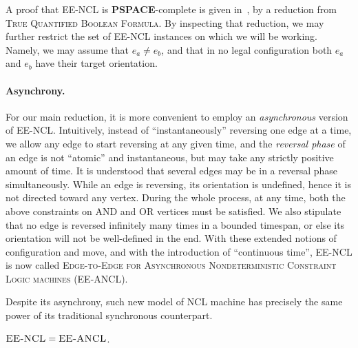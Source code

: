 \documentclass{style}
\newcommand{\complexityclass}[1]{\textbf{#1}}
\newcommand{\computproblem}[1]{\textsc{#1}}
\newcommand{\PSPACE}{\complexityclass{PSPACE}\xspace}
\newcommand{\EENCL}{\computproblem{EE-NCL}\xspace}
\newcommand{\EEANCL}{\computproblem{EE-ANCL}\xspace}
\begin{document}
A proof that \EENCL is \PSPACE-complete is given in~\cite{ncl}, by a reduction from \computproblem{True Quantified Boolean Formula}. By inspecting that reduction, we may further restrict the set of \EENCL instances on which we will be working. Namely, we may assume that $e_a\neq e_b$, and that in no legal configuration both $e_a$ and $e_b$ have their target orientation.

\paragraph{Asynchrony.}

For our main reduction, it is more convenient to employ an \emph{asynchronous} version of \EENCL. Intuitively, instead of ``instantaneously'' reversing one edge at a time, we allow any edge to start reversing at any given time, and the \emph{reversal phase} of an edge is not ``atomic'' and instantaneous, but may take any strictly positive amount of time. It is understood that several edges may be in a reversal phase simultaneously. While an edge is reversing, its orientation is undefined, hence it is not directed toward any vertex. During the whole process, at any time, both the above constraints on AND and OR vertices must be satisfied. We also stipulate that no edge is reversed infinitely many times in a bounded timespan, or else its orientation will not be well-defined in the end. With these extended notions of configuration and move, and with the introduction of ``continuous time'', \EENCL is now called \computproblem{Edge-to-Edge for Asynchronous Nondeterministic Constraint Logic machines} (\EEANCL).

Despite its asynchrony, such new model of NCL machine has precisely the same power of its traditional synchronous counterpart.

\begin{theorem}\label{asynch}$\EENCL = \EEANCL$.\end{theorem}
\end{document}
